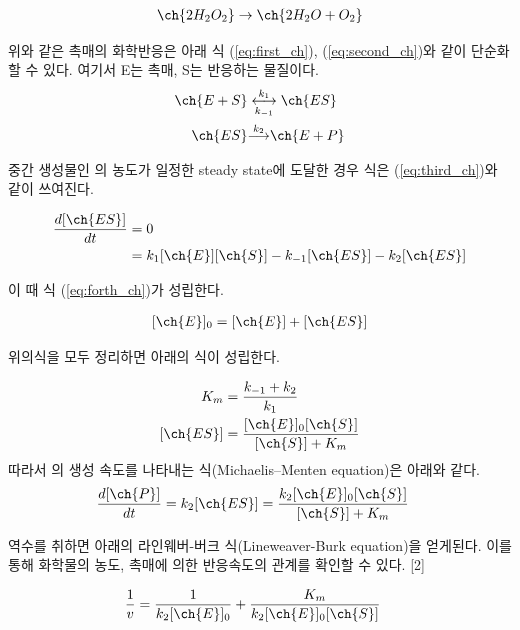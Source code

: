 \documentclass[%
 reprint,
 amsmath,amssymb,
 aps,
]{revtex4-2}
\begin{document}
\begin{align}
	\ch{2 H_{2}O_{2}} \rightarrow \ch{2 H_{2}O + O_{2}}
\end{align}

위와 같은 촉매의 화학반응은 아래 식 (\ref{eq:first_ch}), (\ref{eq:second_ch})와 같이 단순화할 수 있다. 여기서 E는 촉매, S는 반응하는 물질이다.  
\begin{align}
	\ch{E + S} &\underset{k_{-1}}{\overset{k_{1}}{\longleftrightarrow}} \ch{ES} \label{eq:first_ch}\\
	\ch{ES} &{\overset{k_{2}}{\longrightarrow}} \ch{E + P} \label{eq:second_ch}
\end{align}

중간 생성물인 의 농도가 일정한 steady state에 도달한 경우 식은 (\ref{eq:third_ch})와 같이 쓰여진다. 

\begin{align}
	\begin{split} \label{eq:third_ch}
		\frac{d[\ch{ES}]}{dt} & = 0 \\
	&= k_{1}[\ch{E}][\ch{S}] - k_{-1}[\ch{ES}] - k_{2}[\ch{ES}]
	\end{split}
\end{align}

이 때 식 (\ref{eq:forth_ch})가 성립한다.

\begin{align}\label{eq:forth_ch}
	[\ch{E}]_{0} = [\ch{E}] + [\ch{ES}]
\end{align}

위의식을 모두 정리하면 아래의 식이 성립한다.

\begin{align}
	K_{m} &= \frac{k_{-1} + k_{2}}{k_{1}}\\
	[\ch{ES}] &= \frac{[\ch{E}]_{0}[\ch{S}]}{[\ch{S}] + K_{m}}
\end{align}
따라서 의 생성 속도를 나타내는 식(Michaelis–Menten equation)은 아래와 같다.
\begin{align}
	\frac{d[\ch{P}]}{dt} &= k_{2}[\ch{ES}] = \frac{k_{2}[\ch{E}]_{0}[\ch{S}]}{[\ch{S}] + K_{m}}
\end{align}

역수를 취하면 아래의 라인웨버-버크 식(Lineweaver-Burk equation)을 얻게된다. 이를 통해 화학물의 농도, 촉매에 의한 반응속도의 관계를 확인할 수 있다. [2]

\begin{align}
	\frac{1}{v} &= \frac{1}{k_{2}[\ch{E}]_{0}} + \frac{K_{m}}{k_{2}[\ch{E}]_{0}[\ch{S}]}
\end{align}
\end{document}
